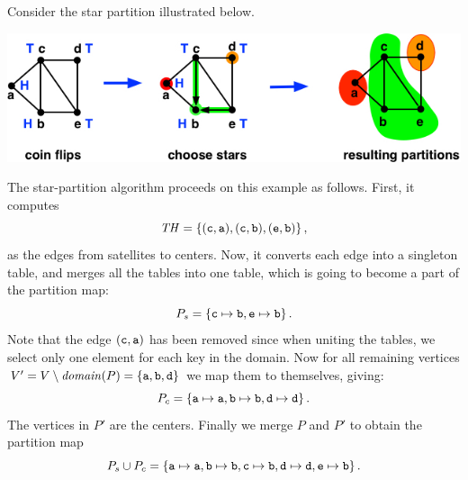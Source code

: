 \begin{flex}
\begin{example}
\label{ex:graphcon::star::partition::alg}

Consider the star partition illustrated below.
\begin{center}
  \includegraphics[width=6in]{./graph-contraction/media-star/star-find0.jpg}
\end{center}

The  star-partition algorithm proceeds on this example as follows.
%
First, it computes
%
\[
\mathit{TH} =
\left\{ (\texttt{c},\texttt{a}),(\texttt{c},\texttt{b}),(\texttt{e},\texttt{b}) \right\},
\]
%
as the edges from satellites to centers.  
%
Now, it
converts each edge into a singleton table, and merges all the tables
into one
table, which is going to become a part of the partition map:
%
\[
P_s = \left\{ \texttt{c} \mapsto \texttt{b},\texttt{e} \mapsto \texttt{b} \right\}.
\]
%
Note that the edge $(\texttt{c},\texttt{a})$ has been removed since when
uniting the tables, we select only one element for each key in the
domain.  
%
Now for all remaining vertices
%
$V' = V \setminus \mathit{domain}(P) = \left\{ \texttt{a},\texttt{b},\texttt{d} \right\}$
we map them to themselves, giving:
%
\[
P_c = \left\{ \texttt{a} \mapsto \texttt{a}, \texttt{b} \mapsto \texttt{b},
  \texttt{d} \mapsto \texttt{d} \right\}.
\]
%
The vertices in $P'$ are the centers.
%
Finally we merge $P$ and $P'$ to obtain the partition map
%
\[
P_s \cup P_c = \left\{ \texttt{a} \mapsto \texttt{a}, \texttt{b} \mapsto \texttt{b}, \texttt{c} \mapsto \texttt{b}, \texttt{d} \mapsto
    \texttt{d}, \texttt{e} \mapsto \texttt{b} \right\}.
\]
\end{example}
\end{flex}





